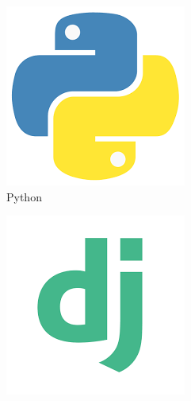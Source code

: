 \begin{figure}[!tbp]
	\begin{subfigure}[b]{0.10\textwidth}
		\includegraphics[width=\textwidth, height=\textwidth]{imagenes/software_usado/icono_python.png}
		\caption{Python}
	\end{subfigure}
	\hfill
	\begin{subfigure}[b]{0.1\textwidth}
		\includegraphics[width=\textwidth, height=\textwidth]{imagenes/software_usado/icono_django.png}

\end{subfigure}
\end{figure}
